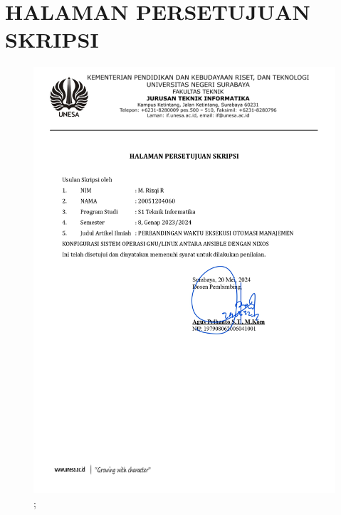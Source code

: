 \documentclass[10pt,twoside]{report}
\begin{document}
\chapter*{HALAMAN PERSETUJUAN SKRIPSI}
\begin{figure}[H]
	\hspace{-1cm}
	\begin{centering}
		\includegraphics[scale=0.5]{images/Halaman Persetujuan Penilaian.jpg};
	\end{centering}
\end{figure}
\clearpage
\end{document}
